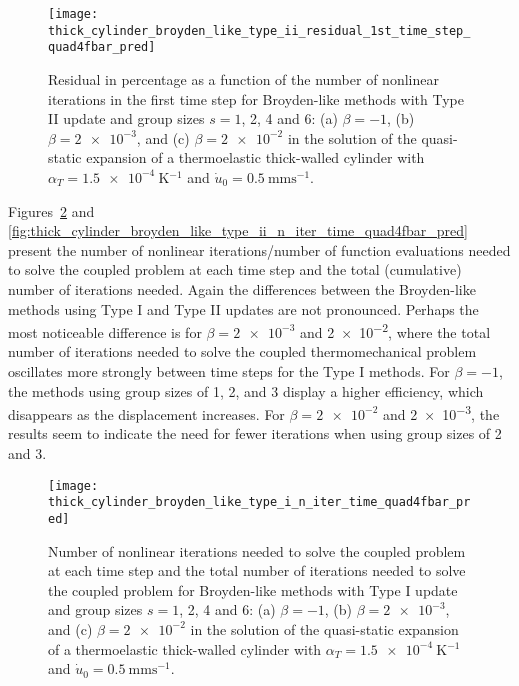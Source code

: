 \begin{figure}[htbp]
 \centering
 \texttt{[image: thick\_cylinder\_broyden\_like\_type\_ii\_residual\_1st\_time\_step\_quad4fbar\_pred]}
 \caption{Residual in percentage as a function of the number of nonlinear iterations in the first time step for Broyden-like methods with Type II update and group sizes \(s=1\), 2, 4 and 6: (a) \(\beta=-1\), (b) \(\beta=\num{2e-3}\), and (c) \(\beta=\num{2e-2}\) in the solution of the quasi-static expansion of a thermoelastic thick-walled cylinder with \(\alpha_T=\SI{1.5e-4}{\kelvin^{-1}}\) and \(\dot u_0 =\SI{0.5}{\milli\meter\second^{-1}}\).}
\label{fig:thick_cylinder_broyden_like_type_ii_residual_1st_time_step_quad4fbar_pred}
\end{figure}

Figures~\ref{fig:thick_cylinder_broyden_like_type_i_n_iter_time_quad4fbar_pred} and \ref{fig:thick_cylinder_broyden_like_type_ii_n_iter_time_quad4fbar_pred} present the number of nonlinear iterations/number of function evaluations needed to solve the coupled problem at each time step and the total (cumulative) number of iterations needed.
Again the differences between the Broyden-like methods using Type I and Type II updates are not pronounced.
Perhaps the most noticeable difference is for \(\beta=\num{2e-3}\) and \num{2e-2}, where the total number of iterations needed to solve the coupled thermomechanical problem oscillates more strongly between time steps for the Type I methods.
For \(\beta=-1\), the methods using group sizes of 1, 2, and 3 display a higher efficiency, which disappears as the displacement increases.
For \(\beta=\num{2e-2}\) and \num{2e-3}, the results seem to indicate the need for fewer iterations when using group sizes of 2 and 3.

\begin{figure}[htbp]
 \centering
 \texttt{[image: thick\_cylinder\_broyden\_like\_type\_i\_n\_iter\_time\_quad4fbar\_pred]}
 \caption{Number of nonlinear iterations needed to solve the coupled problem at each time step and the total number of iterations needed to solve the coupled problem for Broyden-like methods with Type I update and group sizes \(s=1\), 2, 4 and 6: (a) \(\beta=-1\), (b) \(\beta=\num{2e-3}\), and (c) \(\beta=\num{2e-2}\) in the solution of the quasi-static expansion of a thermoelastic thick-walled cylinder with \(\alpha_T=\SI{1.5e-4}{\kelvin^{-1}}\) and \(\dot u_0 =\SI{0.5}{\milli\meter\second^{-1}}\).}
\label{fig:thick_cylinder_broyden_like_type_i_n_iter_time_quad4fbar_pred}
\end{figure}

